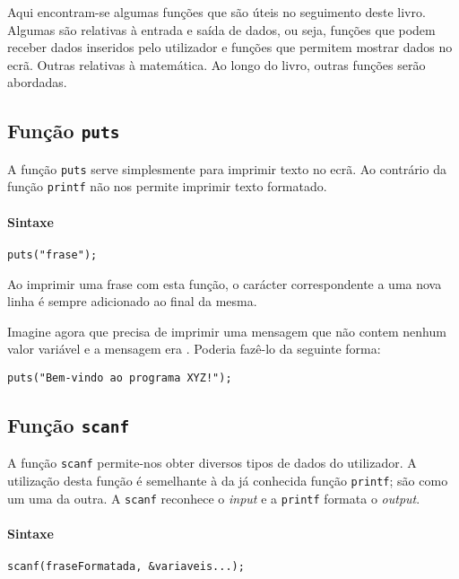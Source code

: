 Aqui encontram-se algumas funções que são úteis no seguimento deste livro. Algumas são relativas à entrada e saída de dados, ou seja, funções que podem receber dados inseridos pelo utilizador e funções que permitem mostrar dados no ecrã. Outras relativas à matemática. Ao longo do livro, outras funções serão abordadas.

\subsection{Função \texttt{puts}}

A função \texttt{puts} serve simplesmente para imprimir texto no ecrã. Ao contrário da função \texttt{printf} não nos permite imprimir texto formatado.

\paragraph{Sintaxe}

\begin{lstlisting}
puts("frase");
\end{lstlisting}

Ao imprimir uma frase com esta função, o carácter correspondente a uma nova linha é sempre adicionado ao final da mesma.

Imagine agora que precisa de imprimir uma mensagem que não contem nenhum valor variável e a mensagem era . Poderia fazê-lo da seguinte forma:

\begin{lstlisting}
puts("Bem-vindo ao programa XYZ!");
\end{lstlisting}

\subsection{Função \texttt{scanf}}

A função \texttt{scanf} permite-nos obter diversos tipos de dados do utilizador. A utilização desta função é semelhante à da já conhecida função \texttt{printf}; são como um  uma da outra. A \texttt{scanf} reconhece o \textit{input} e a \texttt{printf} formata o \textit{output}.

\paragraph{Sintaxe}

\begin{lstlisting}
scanf(fraseFormatada, &variaveis...);
\end{lstlisting}


